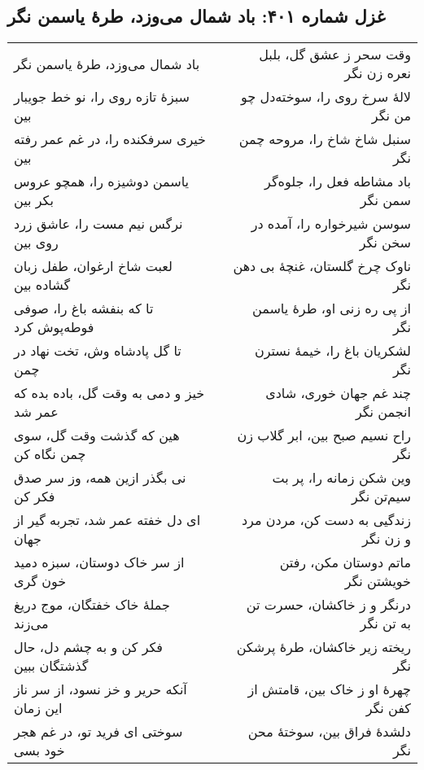 \begin{center}
\section*{غزل شماره ۴۰۱: باد شمال می‌وزد، طرهٔ یاسمن نگر}
\label{sec:401}
\begin{longtable}{l p{0.5cm} r}
باد شمال می‌وزد، طرهٔ یاسمن نگر
&&
وقت سحر ز عشق گل، بلبل نعره زن نگر
\\
سبزهٔ تازه روی را، نو خط جویبار بین
&&
لالهٔ سرخ روی را، سوخته‌دل چو من نگر
\\
خیری سرفکنده را، در غم عمر رفته بین
&&
سنبل شاخ شاخ را، مروحه چمن نگر
\\
یاسمن دوشیزه را، همچو عروس بکر بین
&&
باد مشاطه فعل را، جلوه‌گر سمن نگر
\\
نرگس نیم مست را، عاشق زرد روی بین
&&
سوسن شیرخواره را، آمده در سخن نگر
\\
لعبت شاخ ارغوان، طفل زبان گشاده بین
&&
ناوک چرخ گلستان، غنچهٔ بی دهن نگر
\\
تا که بنفشه باغ را، صوفی فوطه‌پوش کرد
&&
از پی ره زنی او، طرهٔ یاسمن نگر
\\
تا گل پادشاه وش، تخت نهاد در چمن
&&
لشکریان باغ را، خیمهٔ نسترن نگر
\\
خیز و دمی به وقت گل، باده بده که عمر شد
&&
چند غم جهان خوری، شادی انجمن نگر
\\
هین که گذشت وقت گل، سوی چمن نگاه کن
&&
راح نسیم صبح بین، ابر گلاب زن نگر
\\
نی بگذر ازین همه، وز سر صدق فکر کن
&&
وین شکن زمانه را، پر بت سیم‌تن نگر
\\
ای دل خفته عمر شد، تجربه گیر از جهان
&&
زندگیی به دست کن، مردن مرد و زن نگر
\\
از سر خاک دوستان، سبزه دمید خون گری
&&
ماتم دوستان مکن، رفتن خویشتن نگر
\\
جملهٔ خاک خفتگان، موج دریغ می‌زند
&&
درنگر و ز خاکشان، حسرت تن به تن نگر
\\
فکر کن و به چشم دل، حال گذشتگان ببین
&&
ریخته زیر خاکشان، طرهٔ پرشکن نگر
\\
آنکه حریر و خز نسود، از سر ناز این زمان
&&
چهرهٔ او ز خاک بین، قامتش از کفن نگر
\\
سوختی ای فرید تو، در غم هجر خود بسی
&&
دلشدهٔ فراق بین، سوختهٔ محن نگر
\\
\end{longtable}
\end{center}
